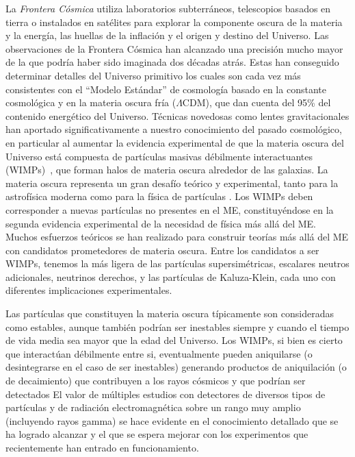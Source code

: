 La \emph{Frontera Cósmica} utiliza laboratorios subterráneos,
telescopios basados en tierra o instalados en satélites
para explorar la componente oscura de la materia y la energía, las huellas
de la inflación y el origen y destino del Universo. Las observaciones
de la Frontera Cósmica han alcanzado una precisión mucho mayor de la
que podría haber sido imaginada dos décadas atrás. Estas han conseguido
determinar detalles del Universo primitivo los cuales son cada vez más
consistentes con el ``Modelo Estándar'' de cosmología basado en la
constante cosmológica y en la materia oscura fría ($\Lambda$CDM), que
dan cuenta del 95\% del contenido energético del Universo. Técnicas
novedosas como lentes gravitacionales han aportado significativamente
a nuestro conocimiento del pasado cosmológico, en particular al
aumentar la evidencia experimental de que la materia oscura del
Universo está compuesta de partículas masivas débilmente
interactuantes (WIMPs)~\cite{Jungman:1995df,Bertone:2004pz}, que forman
halos de materia oscura alrededor de las galaxias.
La materia oscura representa un gran desafío teórico y experimental,
tanto para la astrofísica moderna como para la física de partículas
\cite{Jungman:1995df,Bertone:2004pz, Amsler:2008zzb, Bertone:2010}.
Los WIMPs deben corresponder a nuevas partículas no presentes en el
ME, constituyéndose en la segunda evidencia experimental de la necesidad
de física más allá del ME.  Muchos esfuerzos teóricos se han realizado
para construir teorías más allá del ME con candidatos
prometedores de materia oscura. Entre los candidatos a ser WIMPs,
tenemos la más ligera de las partículas supersimétricas, escalares
neutros adicionales, neutrinos derechos, y las partículas de
Kaluza-Klein, cada uno con diferentes implicaciones experimentales.


Las partículas que constituyen la materia oscura típicamente son
consideradas como estables, aunque también podrían ser
inestables siempre y cuando el tiempo de vida media sea mayor que la
edad del Universo. Los WIMPs, si bien es cierto que interactúan débilmente
entre si, eventualmente pueden aniquilarse (o desintegrarse en el caso
de ser inestables) generando productos de aniquilación (o de decaimiento)
que contribuyen a los rayos cósmicos y que podrían ser detectados
El valor de múltiples
estudios con detectores de diversos tipos de partículas y de radiación
electromagnética sobre un rango muy amplio (incluyendo rayos gamma) se
hace evidente en el conocimiento detallado que se ha logrado alcanzar
y el que se espera mejorar con los experimentos que recientemente han
entrado en funcionamiento.

